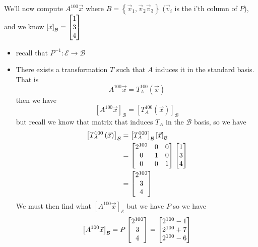 \documentclass[11pt]{book}
\begin{document}
\begin{eg}
    We'll now compute $A^{100} \vec{x} $ where $B= \left\{ \vec{v} _{1} , \vec{v} _{2} \vec{v} _{3}  \right\} $ ($\vec{v} _{i} $ is the i'th column of $P$), and we know $\left[ \vec{x}  \right]_{\mathcal{B}} = \begin{bmatrix} 1 \\ 3 \\ 4 \end{bmatrix} $
    \begin{itemize}
        \item recall that $P^{-1} : \mathcal{E} \to \mathcal{B} $ 
        \item There exists a transformation $T$ such that $A$ induces it in the standard basis. That is 
            \[
            A^{100} \vec{x} = T^{100} _{A} \left(\vec{x} \right) 
            \]
            then we have 
            \[
            \left[ A^{100} \vec{x}  \right]_{\mathcal{B}} = \left[ T^{100} _{A} \left(\vec{x} \right)  \right]_{\mathcal{B}} 
            \]
            but recall we know that matrix that induces $T_{A} $ in the $\mathcal{B} $ basis, so we have 
            \begin{align*}
                \left[ T_{A} ^{100} \left( \vec{x}  \right)  \right]_{\mathcal{B}} &= \left[ T^{100} _{A}  \right]_{\mathcal{B}}\left[ \vec{x}  \right]_{\mathcal{B}}    \\ 
                &= \begin{bmatrix} 2^{100}  & 0 & 0 \\ 0 & 1 & 0 \\ 0 & 0 & 1 \end{bmatrix} \begin{bmatrix} 1 \\ 3 \\ 4 \end{bmatrix} \\
                &= \begin{bmatrix} 2^{100}  \\ 3 \\ 4 \end{bmatrix}  
            \end{align*}
        We must then find what $\left[ A^{100} \vec{x}  \right]_{\mathcal{E}} $ but we have $P$ so we have 
        \[
        \left[ A^{100} \vec{x}  \right]_{\mathcal{B}} = P\begin{bmatrix} 2^{100}  \\ 3 \\ 4 \end{bmatrix} = \begin{bmatrix} 2^{100}  - 1 \\ 2^{100}  + 7 \\ 2^{100} -6 \end{bmatrix} 
        \]
        
    \end{itemize}
\end{eg}



\end{document}
